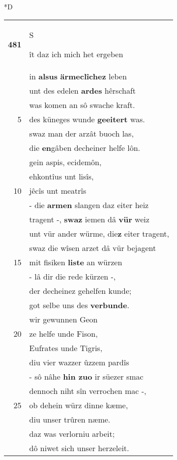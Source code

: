 \documentclass[8pt,a4paper,notitlepage]{article}
\begin{document}
\begin{table}[ht]
\begin{minipage}[t]{0.5\linewidth}
\small
\begin{center}*D
\end{center}
\begin{tabular}{rl}
\textbf{481} & \begin{large}S\end{large}ît daz ich mich het ergeben\\ 
 & in \textbf{alsus} \textbf{ärmeclîchez} leben\\ 
 & unt des edelen \textbf{ardes} hêrschaft\\ 
 & was komen an sô swache kraft.\\ 
5 & des küneges wunde \textbf{geeitert} was.\\ 
 & swaz man der arzât buoch las,\\ 
 & die \textbf{en}gâben decheiner helfe lôn.\\ 
 & gein aspis, ecidemôn,\\ 
 & ehkontîus unt lisîs,\\ 
10 & jêcîs unt meatrîs\\ 
 & - die \textbf{armen} slangen daz eiter heiz\\ 
 & tragent -, \textbf{swaz} iemen dâ \textbf{vür} weiz\\ 
 & unt vür ander würme, die\textbf{z} eiter tragent,\\ 
 & swaz die wîsen arzet dâ vür bejagent\\ 
15 & mit fisiken \textbf{liste} an würzen\\ 
 & - lâ dir die rede kürzen -,\\ 
 & der decheinez gehelfen kunde;\\ 
 & got selbe uns des \textbf{verbunde}.\\ 
 & wir gewunnen Geon\\ 
20 & ze helfe unde Fison,\\ 
 & Eufrates unde Tigris,\\ 
 & diu vier wazzer ûzzem pardîs\\ 
 & - sô nâhe \textbf{hin zuo} ir süezer smac\\ 
 & dennoch niht sîn verrochen mac -,\\ 
25 & ob dehein würz dinne kæme,\\ 
 & diu unser trûren næme.\\ 
 & daz was verlorniu arbeit;\\ 
 & dô niwet sich unser herzeleit.\\ 

\end{tabular}
\end{minipage}
\end{table}
\end{document}
